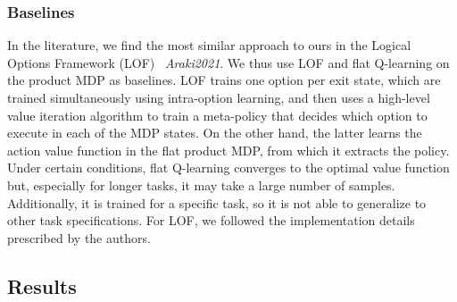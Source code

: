 \subsubsection{Baselines} In the literature, we find the most similar approach to ours in the Logical Options Framework (LOF) ~\textit{Araki2021}. We thus use LOF and flat Q-learning on the product MDP as baselines. LOF trains one option per exit state, which are trained simultaneously using intra-option learning, and then uses a high-level value iteration algorithm to train a meta-policy that decides which option to execute in each of the MDP states. On the other hand, the latter learns the action value function in the flat product MDP, from which it extracts the policy. Under certain conditions, flat Q-learning converges to the optimal value function but, especially for longer tasks, it may take a large number of samples. Additionally, it is trained for a specific task, so it is not able to generalize to other task specifications. For LOF, we followed the implementation details prescribed by the authors. 

\subsection{Results}
